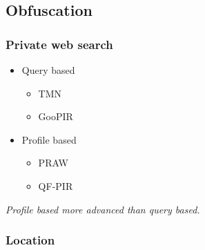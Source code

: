 \documentclass[../overview.tex]{subfiles}
\begin{document}
\subsection{Obfuscation}
\subsubsection{Private web search}
\begin{itemize}
	\item Query based
	\begin{itemize}
		\item TMN
		\item GooPIR
	\end{itemize}
	\item Profile based
	\begin{itemize}
		\item PRAW
		\item QF-PIR
	\end{itemize}
\end{itemize}
\emph{Profile based more advanced than query based.}
\subsubsection{Location}
\end{document}
